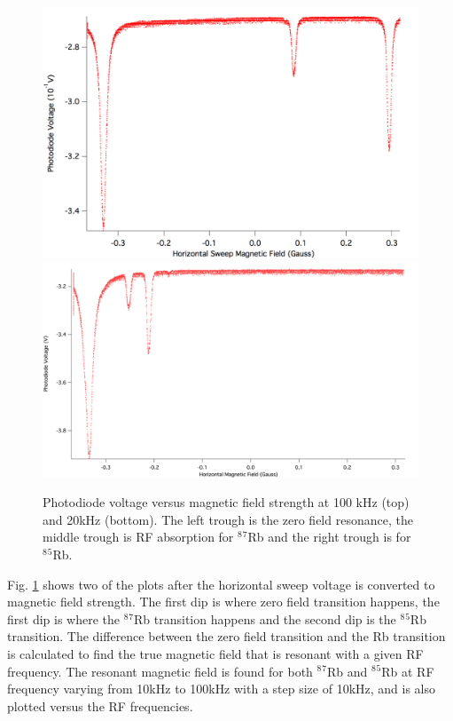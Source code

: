 \documentclass[prb,preprint]{revtex4-1}
\begin{document}
\begin{figure}[h!!!!!!!!]
\centering
\includegraphics[width=16cm]{100kHz.png}
\includegraphics[width=16cm]{20kHz.png}
\caption{Photodiode voltage versus magnetic field strength at 100 kHz (top) and 20kHz (bottom). The left trough is the zero field resonance, the middle trough is RF absorption for $^8$$^7$Rb and the right trough is for $^8$$^5$Rb.}
\label{100kHz}
\end{figure}

Fig. \ref{100kHz} shows two of the plots after the horizontal sweep voltage is converted to magnetic field strength. The first dip is where zero field transition happens, the first dip is where the  $^8$$^7$Rb transition happens and the second dip is the $^8$$^5$Rb transition. The difference between the zero field transition and the Rb transition is calculated to find the true magnetic field that is resonant with a given RF frequency. The resonant magnetic field is found for both $^8$$^7$Rb and $^8$$^5$Rb at RF frequency varying from 10kHz to 100kHz with a step size of 10kHz, and is also plotted versus the RF frequencies. \\
\end{document}
